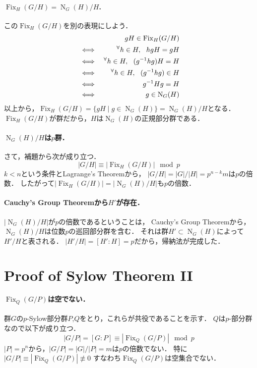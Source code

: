 \documentclass[a4paper]{jsarticle}
\newcommand{\Fix}{\operatorname{Fix}}
\newcommand{\Norm}{\operatorname{N}}
\begin{document}
    \paragraph{$\Fix_{H}(G/H)=\Norm_G(H)/H$.}
    この$\Fix_{H}(G/H)$を別の表現にしよう．
    \begin{eqnarray*}
        &{}&    gH \in \Fix_H(G/H) \\
        &\iff&  \Forall{h \in H} hgH=gH \\
        &\iff&  \Forall{h \in H} (g^{-1}hg)H=H \\
        &\iff&  \Forall{h \in H} (g^{-1}hg) \in H \\
        &\iff&  g^{-1}Hg = H \\
        &\iff&  g \in \Norm_G(H)
    \end{eqnarray*}
    以上から，$\Fix_{H}(G/H)=\{ gH \mid g \in \Norm_G(H) \} = \Norm_G(H)/H$となる．
    $\Fix_{H}(G/H)$が群だから，$H$は$\Norm_G(H)$の正規部分群である．

    \paragraph{$\Norm_G(H)/H$は$p$群．}
    さて，補題から次が成り立つ．
    \[ |G/H| \equiv |\Fix_{H}(G/H)| \mod p \]
    $k<n$という条件とLagrange's Theoremから，
    $|G/H|=|G|/|H|=p^{n-k}m$は$p$の倍数．
    したがって$|\Fix_{H}(G/H)|=|\Norm_G(H)/H|$も$p$の倍数．

    \paragraph{Cauchy's Group Theoremから$H'$が存在．}
    $|\Norm_G(H)/H|$が$p$の倍数であるということは，
    Cauchy's Group Theoremから，$\Norm_G(H)/H$は位数$p$の巡回部分群を含む．
    それは群$H' \subset \Norm_G(H)$によって$H'/H$と表される．
    $|H'/H|=[H':H]=p$だから，帰納法が完成した．
    
    \section{Proof of Sylow Theorem II}
    \paragraph{$\Fix_Q(G/P)$は空でない．}
    群$G$の$p$-Sylow部分群$P$,$Q$をとり，これらが共役であることを示す．
    $Q$は$p$-部分群なので以下が成り立つ．
    \[ |G/P|=[G:P] \equiv |\Fix_Q(G/P)| \mod p \]
    $|P|=p^n$から，$|G/P|=|G|/|P|=m$は$p$の倍数でない．
    特に$|G/P| \equiv |\Fix_Q(G/P)| \not \equiv 0$
    すなわち$\Fix_Q(G/P)$は空集合でない．
\end{document}
